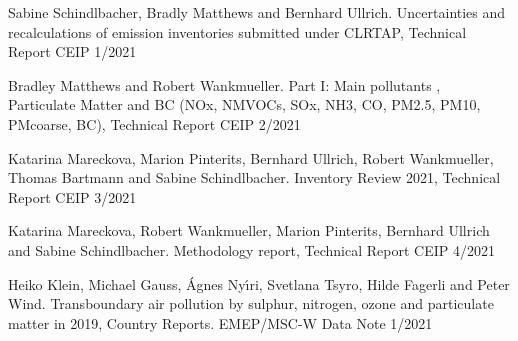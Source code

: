 \enlargethispage{\baselineskip}
\begin{list}{}{\setlength{\leftmargin}{15pt}\setlength{\itemindent}{-\leftmargin}}\small

\item[]  
Sabine Schindlbacher, Bradly Matthews and Bernhard Ullrich. Uncertainties and recalculations of emission inventories submitted under CLRTAP, Technical Report CEIP 1/2021

\item[]
Bradley Matthews and Robert Wankmueller. Part I:  Main pollutants , Particulate Matter and BC (NOx, NMVOCs, SOx, NH3, CO, PM2.5, PM10, PMcoarse, BC), Technical Report CEIP 2/2021

\item[]
 Katarina Mareckova, Marion Pinterits, Bernhard Ullrich,  Robert Wankmueller, Thomas Bartmann and Sabine Schindlbacher. Inventory Review 2021,  Technical Report CEIP 3/2021
  
\item[]
Katarina Mareckova, Robert Wankmueller, Marion Pinterits, Bernhard Ullrich and Sabine Schindlbacher. Methodology report, Technical Report CEIP 4/2021

\end{list}



 \enlargethispage{\baselineskip}
 \begin{list}{}{\setlength{\leftmargin}{15pt}\setlength{\itemindent}{-\leftmargin}}\small

 \item[]
 Heiko Klein, Michael Gauss, \'Agnes  Ny\'{\i}ri, Svetlana Tsyro, Hilde Fagerli and Peter Wind. 
Transboundary air pollution by sulphur, nitrogen, ozone and particulate matter in 2019, Country Reports. EMEP/MSC-W Data Note 1/2021


 \end{list}







\newpage
\renewcommand\bibname{References}      %
%

